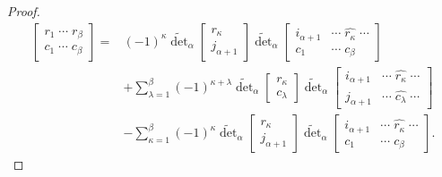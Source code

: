 \documentclass{amsart}
\begin{document}
{{\begin{proof}
\begin{align}
\begin{bmatrix}
                    r_1\;\cdots\;r_\beta\\
                    c_1\;\cdots\;c_\beta
                \end{bmatrix}={}&(-1)^\kappa\widetilde{\det}_\alpha\begin{bmatrix}
                    r_\kappa\\
                    j_{\alpha+1}
                \end{bmatrix}\widetilde{\det}_\alpha\begin{bmatrix}
                    i_{\alpha+1}&\cdots\;\widehat{r_\kappa}\;\cdots\\
                    c_1&\cdots\;c_\beta
                \end{bmatrix}\\
                &+\sum_{\lambda=1}^\beta(-1)^{\kappa+\lambda}\widetilde{\det}_\alpha\begin{bmatrix}
                    r_\kappa\\
                    c_\lambda
                \end{bmatrix}\widetilde{\det}_\alpha\begin{bmatrix}
                    i_{\alpha+1}&\cdots\;\widehat{r_\kappa}\;\cdots\\
                    j_{\alpha+1}&\cdots\;\widehat{c_\lambda}\;\cdots
                \end{bmatrix}\\
                &-\sum_{\kappa=1}^\beta(-1)^\kappa\widetilde{\det}_\alpha\begin{bmatrix}
                    r_\kappa\\
                    j_{\alpha+1}
                \end{bmatrix}\widetilde{\det}_\alpha\begin{bmatrix}
                    i_{\alpha+1}&\cdots\;\widehat{r_\kappa}\;\cdots\\
                    c_1&\cdots\;c_\beta
                \end{bmatrix}.
            \end{align}
        \end{proof}
    }
}
\end{document}
